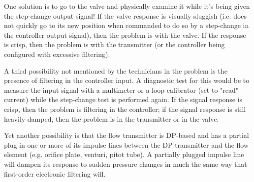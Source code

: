 \vskip 10pt

One solution is to go to the valve and physically examine it while it's being given the step-change output signal!  If the valve response is visually sluggish (i.e. does not quickly go to its new position when commanded to do so by a step-change in the controller output signal), then the problem is with the valve.  If the response is crisp, then the problem is with the transmitter (or the controller being configured with excessive filtering).

\vskip 10pt

A third possibility not mentioned by the technicians in the problem is the presence of filtering in the controller input.  A diagnostic test for this would be to measure the input signal with a multimeter or a loop calibrator (set to "read" current) while the step-change test is performed again.  If the signal response is crisp, then the problem is filtering in the controller; if the signal response is still heavily damped, then the problem is in the transmitter or in the valve.

Yet another possibility is that the flow transmitter is DP-based and has a partial plug in one or more of its impulse lines between the DP transmitter and the flow element (e.g. orifice plate, venturi, pitot tube).  A partially plugged impulse line will dampen its response to sudden pressure changes in much the same way that first-order electronic filtering will.




